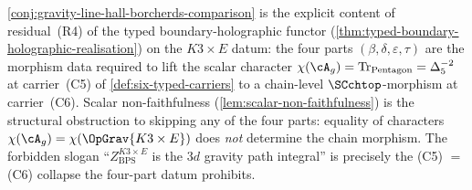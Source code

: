 \begin{remark}%
\label{rem:hall-borcherds-as-C5-to-C6}%
%
%
\cref{conj:gravity-line-hall-borcherds-comparison} is the explicit
content of residual~\textup{(R4)} of the typed boundary-holographic
functor (\cref{thm:typed-boundary-holographic-realisation}) on the
$K3 \times E$ datum: the four parts
$(\beta, \delta, \varepsilon, \tau)$ are the morphism data required
to lift the scalar character
$\chi(\cA_{g}) = \mathrm{Tr}_{\mathrm{Pentagon}} = \Delta_{5}^{-2}$
at carrier~\textup{(C5)} of \cref{def:six-typed-carriers} to a
chain-level $\SCchtop$-morphism at carrier~\textup{(C6)}.  Scalar
non-faithfulness (\cref{lem:scalar-non-faithfulness}) is the
structural obstruction to skipping any of the four parts: equality
of characters $\chi(\cA_{g}) = \chi(\OpGrav{K3 \times E})$ does
\emph{not} determine the chain morphism.  The forbidden slogan
``$Z_{\mathrm{BPS}}^{K3 \times E}$ is the $3d$ gravity path
integral'' is precisely the (C5) $=$ (C6) collapse the four-part
datum prohibits.
\end{remark}

